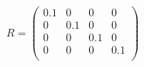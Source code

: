 \documentclass[main]{subfiles}
\begin{document}

\begin{equation}
\label{eq:R}
R = \left(\begin{array}{cccc}
0.1 & 0 & 0 & 0\\
0 & 0.1 & 0 & 0\\
0 & 0 & 0.1 & 0\\
0 & 0 & 0 & 0.1\\
\end{array}\right)
\end{equation}
\end{document}
